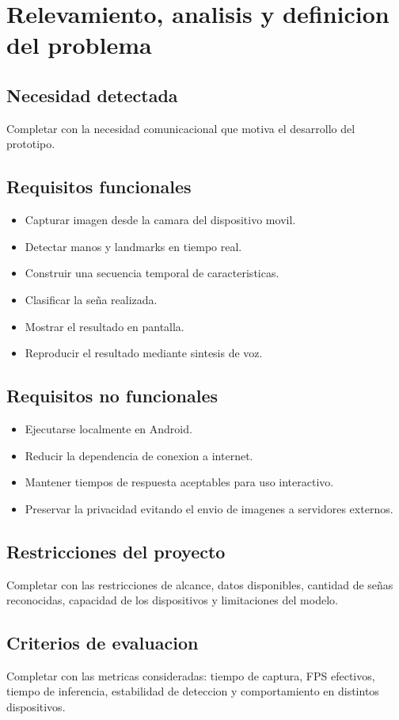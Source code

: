 \chapter{Relevamiento, analisis y definicion del problema}

\section{Necesidad detectada}

Completar con la necesidad comunicacional que motiva el desarrollo del prototipo.

\section{Requisitos funcionales}

\begin{itemize}
    \item Capturar imagen desde la camara del dispositivo movil.
    \item Detectar manos y landmarks en tiempo real.
    \item Construir una secuencia temporal de caracteristicas.
    \item Clasificar la seña realizada.
    \item Mostrar el resultado en pantalla.
    \item Reproducir el resultado mediante sintesis de voz.
\end{itemize}

\section{Requisitos no funcionales}

\begin{itemize}
    \item Ejecutarse localmente en Android.
    \item Reducir la dependencia de conexion a internet.
    \item Mantener tiempos de respuesta aceptables para uso interactivo.
    \item Preservar la privacidad evitando el envio de imagenes a servidores externos.
\end{itemize}

\section{Restricciones del proyecto}

Completar con las restricciones de alcance, datos disponibles, cantidad de señas reconocidas, capacidad de los dispositivos y limitaciones del modelo.

\section{Criterios de evaluacion}

Completar con las metricas consideradas: tiempo de captura, FPS efectivos, tiempo de inferencia, estabilidad de deteccion y comportamiento en distintos dispositivos.
